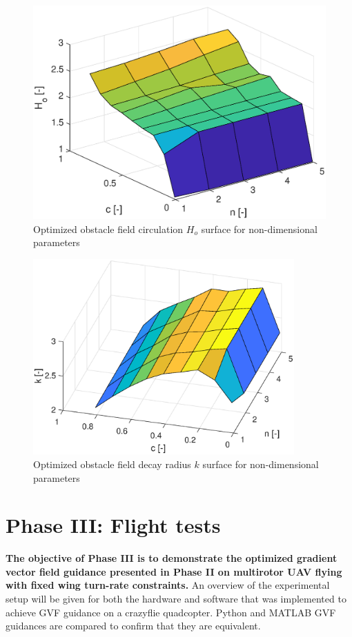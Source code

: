 \documentclass[numbered,pdftex]{ohio-etd}
\begin{document}
\begin{figure}[H]
	\centering
	\includegraphics[width=12cm]{PaperFigures/Methods/LookupTable/circulationTable}
	\caption{Optimized obstacle field circulation $H_o$ surface for non-dimensional parameters}
	\label{fig:circulationtable}
\end{figure}

\begin{figure}[H]
	\centering
	\includegraphics[width=10cm]{PaperFigures/Methods/LookupTable/decayRadiusTable}
	\caption{Optimized obstacle field decay radius $k$ surface for non-dimensional parameters}
	\label{fig:decayradiustable}
\end{figure}





\section{Phase III: Flight tests}
\textbf{The objective of Phase III is to demonstrate the optimized gradient vector field guidance presented in Phase II on multirotor UAV flying with fixed wing turn-rate constraints.} An overview of the experimental setup will be given for both the hardware and software that was implemented to achieve GVF guidance on a crazyflie quadcopter. Python and MATLAB GVF guidances are compared to confirm that they are equivalent.
\end{document}
